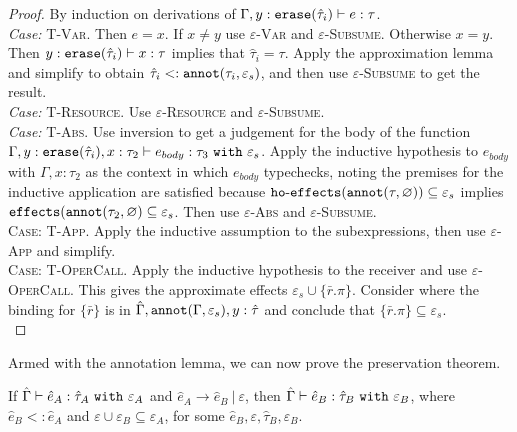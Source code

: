 \begin{proof}
By induction on derivations of $\Gamma, y: \mathtt{erase}(\hat \tau_i) \vdash e: \tau$.\\

\textit{Case:} \textsc{T-Var}. Then $e = x$. If $x \neq y$ use \textsc{$\varepsilon$-Var} and \textsc{$\varepsilon$-Subsume}. Otherwise $x = y$. Then $y: \mathtt{erase}(\hat \tau_i) \vdash x: \tau$ implies that $\hat \tau_i = \tau$. Apply the approximation lemma and simplify to obtain $\hat \tau_i <: \mathtt{annot}(\tau_i, \varepsilon_s)$, and then use \textsc{$\varepsilon$-Subsume} to get the result.\\

\textit{Case:} \textsc{T-Resource}. Use \textsc{$\varepsilon$-Resource} and \textsc{$\varepsilon$-Subsume}.\\

\textit{Case:} \textsc{T-Abs}. Use inversion to get a judgement for the body of the function $\Gamma, y: \mathtt{erase}(\hat \tau_i), x: \tau_2 \vdash e_{body}: \tau_3~\mathtt{with}~ \varepsilon_s$. Apply the inductive hypothesis to $e_{body}$ with $\Gamma, x: \tau_2$ as the context in which $e_{body}$ typechecks, noting the premises for the inductive application are satisfied because $\mathtt{ho \hbox{-} effects}(\mathtt{annot}(\tau, \varnothing)) \subseteq \varepsilon_s$ implies $\mathtt{effects}(\mathtt{annot}(\tau_2, \varnothing) \subseteq \varepsilon_s$. Then use \textsc{$\varepsilon$-Abs} and \textsc{$\varepsilon$-Subsume}.	\\

\textsc{Case:} \textsc{T-App}. Apply the inductive assumption to the subexpressions, then use \textsc{$\varepsilon$-App} and simplify.\\

\textsc{Case:} \textsc{T-OperCall}. Apply the inductive hypothesis to the receiver and use \textsc{$\varepsilon$-OperCall}. This gives the approximate effects $\varepsilon_s \cup \{ \bar r.\pi \}$. Consider where the binding for $\{ \bar r \}$ is in $\hat \Gamma, \mathtt{annot}(\Gamma, \varepsilon_s), y: \hat \tau$ and conclude that $\{ \bar r.\pi \} \subseteq \varepsilon_s$.\\

\end{proof}

\noindent


Armed with the annotation lemma, we can now prove the preservation theorem.


\begin{theorem}
If $\hat \Gamma \vdash \hat e_A: \hat \tau_A~\mathtt{with}~ \varepsilon_A$ and $\hat e_A \longrightarrow \hat e_B~|~\varepsilon$, then $\hat \Gamma \vdash \hat e_B: \hat \tau_B~\mathtt{with}~ \varepsilon_B$, where $\hat e_B <: \hat e_A$ and $\varepsilon \cup \varepsilon_B \subseteq \varepsilon_A$, for some $\hat e_B, \varepsilon, \hat \tau_B, \varepsilon_B$.
\end{theorem}

